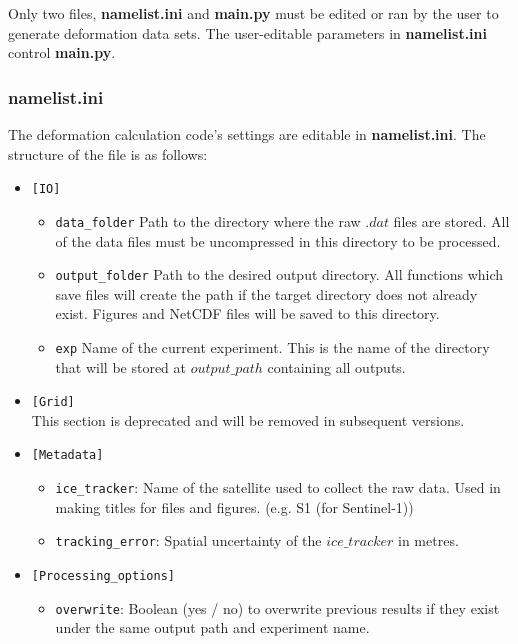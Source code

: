 \documentclass{article}
\begin{document}
        Only two files, \textbf{namelist.ini} and \textbf{main.py} must be edited or ran by the user to generate deformation data sets. The user-editable parameters in \textbf{namelist.ini} control \textbf{main.py}.

        \subsubsection{\textbf{namelist.ini}}

        The deformation calculation code's settings are editable in \textbf{namelist.ini}. The structure of the file is as follows:
        \begin{itemize}
            \item{} \verb?[IO]?
            \begin{itemize}
                \item \verb?data_folder? Path to the directory where the raw $.dat$ files are stored. All of the data files must be uncompressed in this directory to be processed.
                \item \verb?output_folder? Path to the desired output directory. All functions which save files will create the path if the target directory does not already exist. Figures and NetCDF files will be saved to this directory.
                \item \verb?exp? Name of the current experiment. This is the name of the directory that will be stored at $output\_path$ containing all outputs.
            \end{itemize}
            \item{} \verb?[Grid]? \\
                This section is deprecated and will be removed in subsequent versions.
            \item{} \verb?[Metadata]?
            \begin{itemize}
                \item \verb?ice_tracker?: Name of the satellite used to collect the raw data. Used in making titles for files and figures. (e.g. S1 (for Sentinel-1))
                \item \verb?tracking_error?: Spatial uncertainty of the $ice\_tracker$ in metres.
            \end{itemize}
            \item{} \verb?[Processing_options]?
            \begin{itemize}
                \item \verb?overwrite?: Boolean (yes / no) to overwrite previous results if they exist under the same output path and experiment name.

\end{itemize}
\end{itemize}
\end{document}
